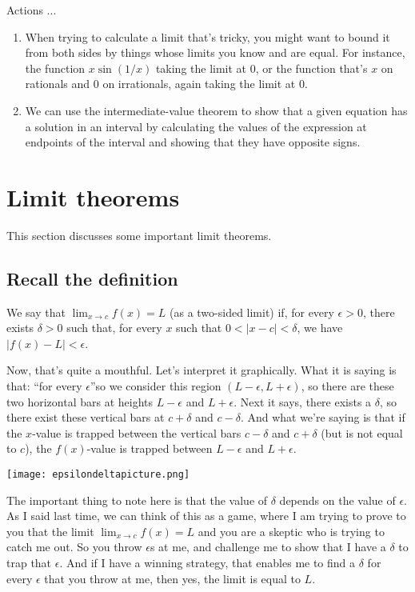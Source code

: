 \documentclass[10pt]{amsart}
\begin{document}
Actions ...

\begin{enumerate}
\item When trying to calculate a limit that's tricky, you might want
  to bound it from both sides by things whose limits you know and are
  equal. For instance, the function $x \sin (1/x)$ taking the limit at
  $0$, or the function that's $x$ on rationals and $0$ on irrationals,
  again taking the limit at $0$.
\item We can use the intermediate-value theorem to show that a given
  equation has a solution in an interval by calculating the values of
  the expression at endpoints of the interval and showing that they
  have opposite signs.
\end{enumerate}


\section{Limit theorems}

This section discusses some important limit theorems.

\subsection*{Recall the definition}

We say that $\lim_{x \to c} f(x) = L$ (as a two-sided limit) if, for
every $\epsilon > 0$, there exists $\delta > 0$ such that, for every
$x$ such that $0 < |x - c| < \delta$, we have $|f(x) - L| < \epsilon$.

Now, that's quite a mouthful. Let's interpret it graphically. What it
is saying is that: ``for every $\epsilon$''so we consider this region
$(L - \epsilon, L + \epsilon)$, so there are these two horizontal bars
at heights $L - \epsilon$ and $L + \epsilon$. Next it says, there
exists a $\delta$, so there exist these vertical bars at $c + \delta$
and $c - \delta$. And what we're saying is that if the $x$-value is
trapped between the vertical bars $c - \delta$ and $c + \delta$ (but
is not equal to $c$), the $f(x)$-value is trapped between $L -
\epsilon$ and $L + \epsilon$.

\texttt{[image: epsilondeltapicture.png]}

The important thing to note here is that the value of $\delta$ depends
on the value of $\epsilon$. As I said last time, we can think of this
as a game, where I am trying to prove to you that the limit $\lim_{x
\to c} f(x) = L$ and you are a skeptic who is trying to catch me
out. So you throw $\epsilon$s at me, and challenge me to show that I
have a $\delta$ to trap that $\epsilon$. And if I have a winning
strategy, that enables me to find a $\delta$ for every $\epsilon$ that
you throw at me, then yes, the limit is equal to $L$.
\end{document}
